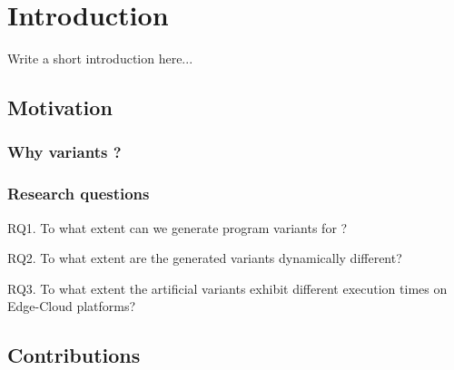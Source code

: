 \chapter{Introduction}

\newcommand{\rqone}{RQ1. To what extent can we generate program variants for \wasm?}
\newcommand{\rqtwo}{RQ2. To what extent are the generated variants dynamically different?}
\newcommand{\rqthree}{RQ3. To what extent the artificial variants exhibit different execution times on Edge-Cloud platforms?}

Write a short introduction here...


\section{Motivation}

\subsection{Why variants ?}

\subsection{Research questions}
\label{intro:definition:rq}

\rqone

\rqtwo

\rqthree

\section{Contributions}